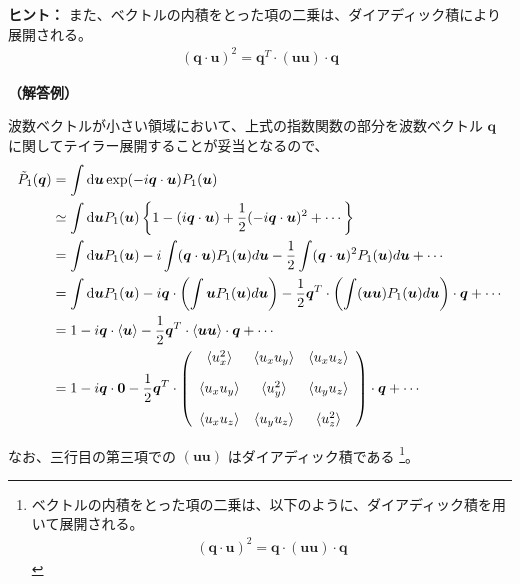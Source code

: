 \documentclass[uplatex,dvipdfmx,a4paper,11pt]{jsarticle}
\newcommand{\diff}{\mathrm d}
\begin{document}
\begin{enumerate}
\begin{itembox}[l]{{\bf ヒント：}}
また、ベクトルの内積をとった項の二乗は、ダイアディック積により展開される。
\begin{align*}
(\bm{q} \cdot \bm{u})^2 = \bm{q}^{T} \cdot (\bm{u} \bm{u}) \cdot \bm{q}
\end{align*}

\end{itembox}

\vspace{10pt}

{\bf （解答例）}

波数ベクトルが小さい領域において、上式の指数関数の部分を波数ベクトル $\bm{q}$ に関してテイラー展開することが妥当となるので、
\begin{align*}
\tilde{P}_1 (\bm{q}) 
	&= \int \diff \bm{u} \exp(- i\bm{q} \cdot \bm{u} ) P_1 (\bm{u}) \\
	&\simeq \int \diff \bm{u} P_1 (\bm{u}) \left \{ 1-( i \bm{q} \cdot \bm{u} ) +\dfrac{1}{2} (-i \bm{q} \cdot \bm{u})^2 + \cdots \right\} \\
	&= \int \diff \bm{u} P_1 (\bm{u}) - i \int (\bm{q} \cdot \bm{u} ) P_1 (\bm{u}) d \bm{u} 
	- \dfrac{1}{2} \int (\bm{q} \cdot \bm{u})^2 P_1 (\bm{u}) d \bm{u} + \cdots \\
	&= \int \diff \bm{u} P_1 (\bm{u}) - i \bm{q} \cdot \left(\int \bm{u} P_1 (\bm{u}) d \bm{u} \right) 
	- \dfrac{1}{2} \bm{q}^{T} \cdot \left( \int (\bm{u} \bm{u}) P_1 (\bm{u}) d \bm{u} \right) \cdot \bm{q} + \cdots \\
	&= 1- i \bm{q} \cdot \langle \bm{u} \rangle 
	- \dfrac{1}{2} \bm{q}^{T} \cdot \langle \bm{u} \bm{u} \rangle \cdot \bm{q} + \cdots \\
	&= 1- i \bm{q} \cdot \bm{0} - \dfrac{1}{2} \bm{q}^{T} \cdot 
	\left (
	\begin{array}{c c c}
	\langle u_x^2 \rangle & \langle u_x u_y \rangle & \langle u_x u_z \rangle \\[10pt]
	\langle u_x u_y \rangle & \langle u_y^2 \rangle & \langle u_y u_z \rangle \\[10pt]
	\langle u_x u_z \rangle & \langle u_y u_z \rangle & \langle u_z^2 \rangle
	\end{array}
	\right)
	\cdot \bm{q} + \cdots
\end{align*}

なお、三行目の第三項での $(\bm{u} \bm{u})$ はダイアディック積である
\footnote
{
ベクトルの内積をとった項の二乗は、以下のように、ダイアディック積を用いて展開される。
\begin{align*}
(\bm{q} \cdot \bm{u})^2 = \bm{q} \cdot (\bm{u} \bm{u}) \cdot \bm{q}
\end{align*}
}。


\end{enumerate}
\end{document}
